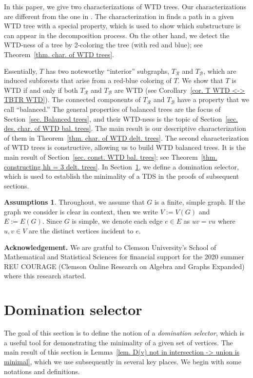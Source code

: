 \documentclass[12pt, reqno]{amsart}
\theoremstyle{definition}
\newtheorem*{assumptions}{Assumptions}
\theoremstyle{plain}
\theoremstyle{definition}
\newcommand{\R}{\mathcal{R}}
\newcommand{\B}{\mathcal{B}}
\begin{document}
In this paper, we give two characterizations of WTD trees.
Our characterizations are different from the one in \cite{finbow2009total}.
The characterization in \cite{finbow2009total} finds a path in a given WTD tree with a special property, which is used to show which substructure is can appear in the decomposition process.
On the other hand, we detect the WTD-ness of a tree by 2-coloring the tree (with red and blue); see Theorem~\ref{thm. char. of WTD trees}.

Essentially, $T$ has two noteworthy ``interior'' subgraphs, $T_\R$ and $T_\B$, which are induced subforests that arise from a red-blue coloring of $T$. 
We show that $T$ is WTD if and only if both $T_\R$ and $T_\B$ are WTD (see Corollary~\ref{cor. T WTD <-> TBTR WTD}).
The connected components of $T_\R$ and $T_\B$ have a property that we call ``balanced.''
The general properties of balanced trees are the focus of Section~\ref{sec. Balanced trees}, and their WTD-ness is the topic of Section~\ref{sec. des. char. of WTD bal. trees}. 
The main result is our descriptive characterization of them in Theorem~\ref{thm. char. of WTD delt. trees}.
The second characterization of WTD trees is constructive, allowing us to build WTD balanced trees.
It is the main result of Section~\ref{sec. const. WTD bal. trees}; see Theorem~\ref{thm. constructing hh = 3 delt. trees}.
In Section~\ref{sec. dom selector}, we define a domination selector, which is used to establish the minimality of a TDS in the proofs of subsequent sections.

\begin{assumptions}
Throughout, we assume that $G$ is a finite, simple graph.
If the graph we consider is clear in context, then we write $V := V(G)$ and $E := E(G)$.
Since $G$ is simple, we denote each edge $e \in E$ as $uv=vu$ where $u,v \in V$ are the distinct vertices incident to $e$.
\end{assumptions}

\noindent\textbf{Acknowledgement.} We are gratful to Clemson University's School of Mathematical and Statistical Sciences for financial support for the 2020 summer REU COURAGE (Clemson Online Research on Algebra and Graphs Expanded) where this research started.

\section{Domination selector}\label{sec. dom selector}

The goal of this section is to define the notion of a \emph{domination selector}, which is a useful tool for demonstrating the minimality of a given set of vertices. 
The main result of this section is Lemma~\ref{lem. D(v) not in intersection -> union is minimal}, which we use subsequently in several key places.
We begin with some notations and definitions.
\end{document}
